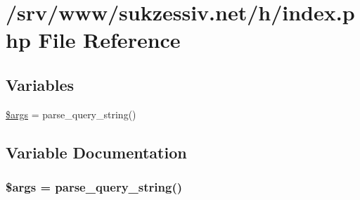\hypertarget{index_8php}{
\section{/srv/www/sukzessiv.net/h/index.php File Reference}
\label{index_8php}
}
\subsection*{Variables}
\begin{CompactItemize}
\item 
\hyperlink{index_8php_67e94494731d99ed23b123e95175bc10}{\$args} = parse\_\-query\_\-string()
\end{CompactItemize}


\subsection{Variable Documentation}
\hypertarget{index_8php_67e94494731d99ed23b123e95175bc10}{
\subsubsection[{\$args}]{\setlength{\rightskip}{0pt plus 5cm}\$args = parse\_\-query\_\-string()}}
\label{index_8php_67e94494731d99ed23b123e95175bc10}


